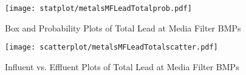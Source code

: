         \begin{figure}[hb]   %
            \centering
            \texttt{[image: statplot/metalsMFLeadTotalprob.pdf]}
            \caption{Box and Probability Plots of Total Lead at Media Filter BMPs}
        \end{figure}         %
        
        
        \begin{figure}[hb]   %
            \centering
            \texttt{[image: scatterplot/metalsMFLeadTotalscatter.pdf]}
            \caption{Influent vs. Effluent Plots of Total Lead at Media Filter BMPs}
        \end{figure}         %
        \clearpage
        